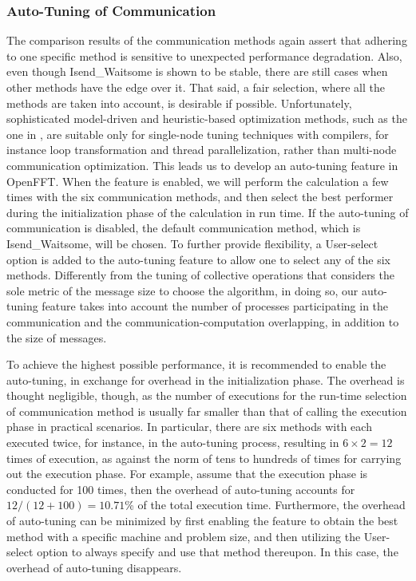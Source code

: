 \subsubsection{Auto-Tuning of Communication}

The comparison results of the communication methods again assert that adhering to one specific method is sensitive to unexpected performance degradation. Also, even though Isend\_Waitsome is shown to be stable, there are still cases when other methods have the edge over it. That said, a fair selection, where all the methods are taken into account, is desirable if possible. Unfortunately, sophisticated model-driven and heuristic-based optimization methods, such as the one in  \cite{Pouchet:2010:CIM:1884643.1884672}, are suitable only for single-node tuning techniques with compilers, for instance loop transformation and thread parallelization, rather than multi-node communication optimization. This leads us to develop an auto-tuning feature in OpenFFT. 
When the feature is enabled, we will perform the calculation a few times with the six communication methods, and then select the best performer during the initialization phase of the calculation in run time. If the auto-tuning of communication is disabled, the default communication method, which is Isend\_Waitsome, will be chosen. To further provide flexibility, a User-select option is added to the auto-tuning feature to allow one to select any of the six methods. Differently from the tuning of collective operations \cite{Thakur03improvingthe} that considers the sole metric of the message size to choose the algorithm, in doing so, our auto-tuning feature takes into account the number of processes participating in the communication and the communication-computation overlapping, in addition to the size of messages.   

To achieve the highest possible performance, it is recommended to enable the auto-tuning, in exchange for overhead in the initialization phase. The overhead is thought negligible, though, as the number of executions for the run-time selection of communication method is usually far smaller than that of calling the execution phase in practical scenarios. In particular, there are six methods with each executed twice, for instance, in the auto-tuning process, resulting in $6 \times 2=12$ times of execution, as against the norm of tens to hundreds of times for carrying out the execution phase. For example, assume that the execution phase is conducted for 100 times, then the overhead of auto-tuning accounts for $12/(12+100)=10.71$\% of the total execution time. Furthermore, the overhead of auto-tuning can be minimized by first enabling the feature to obtain the best method with a specific machine and problem size, and then utilizing the User-select option to always specify and use that method thereupon. In this case, the overhead of auto-tuning disappears. 

